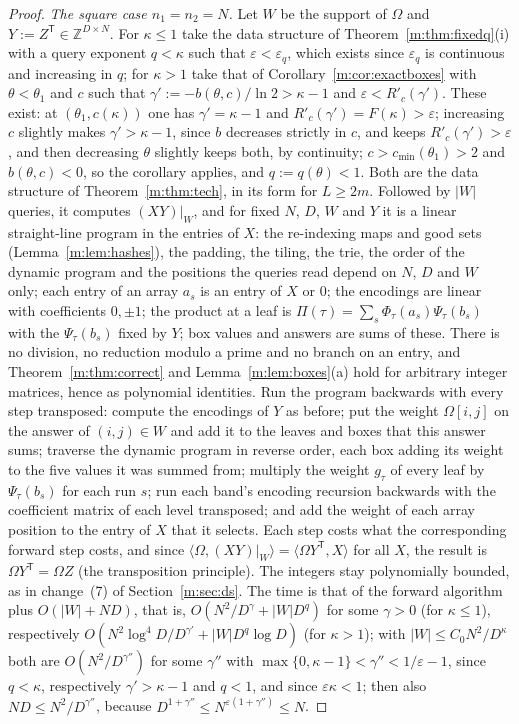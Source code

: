 \documentclass[11pt]{article}
\theoremstyle{definition}
\theoremstyle{remark}
\newcommand{\Z}{\mathbb{Z}}
\begin{document}
\begin{proof}
\emph{The square case $n_1=n_2=N$.} Let $W$ be the support of $\Omega$ and $Y:=Z^{\mathsf T}\in\Z^{D\times N}$. For $\kappa\le1$ take the data structure of Theorem~\ref{m:thm:fixedq}(i) with a query exponent $q<\kappa$ such that $\varepsilon<\varepsilon_q$, which exists since $\varepsilon_q$ is continuous and increasing in $q$; for $\kappa>1$ take that of Corollary~\ref{m:cor:exactboxes} with $\theta<\theta_1$ and $c$ such that $\gamma':=-b(\theta,c)/\ln2>\kappa-1$ and $\varepsilon<R'_c(\gamma')$. These exist: at $(\theta_1,c(\kappa))$ one has $\gamma'=\kappa-1$ and $R'_c(\gamma')=F(\kappa)>\varepsilon$; increasing $c$ slightly makes $\gamma'>\kappa-1$, since $b$ decreases strictly in $c$, and keeps $R'_c(\gamma')>\varepsilon$, and then decreasing $\theta$ slightly keeps both, by continuity; $c>c_{\min}(\theta_1)>2$ and $b(\theta,c)<0$, so the corollary applies, and $q:=q(\theta)<1$. Both are the data structure of Theorem~\ref{m:thm:tech}, in its form for $L\ge2m$. Followed by $|W|$ queries, it computes $(XY)|_W$, and for fixed $N$, $D$, $W$ and $Y$ it is a linear straight-line program in the entries of $X$: the re-indexing maps and good sets (Lemma~\ref{m:lem:hashes}), the padding, the tiling, the trie, the order of the dynamic program and the positions the queries read depend on $N$, $D$ and $W$ only; each entry of an array $a_s$ is an entry of $X$ or $0$; the encodings are linear with coefficients $0,\pm1$; the product at a leaf is $\Pi(\tau)=\sum_s\Phi_\tau(a_s)\Psi_\tau(b_s)$ with the $\Psi_\tau(b_s)$ fixed by $Y$; box values and answers are sums of these. There is no division, no reduction modulo a prime and no branch on an entry, and Theorem~\ref{m:thm:correct} and Lemma~\ref{m:lem:boxes}(a) hold for arbitrary integer matrices, hence as polynomial identities. Run the program backwards with every step transposed: compute the encodings of $Y$ as before; put the weight $\Omega[i,j]$ on the answer of $(i,j)\in W$ and add it to the leaves and boxes that this answer sums; traverse the dynamic program in reverse order, each box adding its weight to the five values it was summed from; multiply the weight $g_\tau$ of every leaf by $\Psi_\tau(b_s)$ for each run $s$; run each band's encoding recursion backwards with the coefficient matrix of each level transposed; and add the weight of each array position to the entry of $X$ that it selects. Each step costs what the corresponding forward step costs, and since $\langle\Omega,(XY)|_W\rangle=\langle\Omega Y^{\mathsf T},X\rangle$ for all $X$, the result is $\Omega Y^{\mathsf T}=\Omega Z$ (the transposition principle). The integers stay polynomially bounded, as in change~(7) of Section~\ref{m:sec:ds}. The time is that of the forward algorithm plus $O(|W|+ND)$, that is, $O(N^2/D^{\gamma}+|W|D^{q})$ for some $\gamma>0$ (for $\kappa\le1$), respectively $O(N^2\log^4\!D/D^{\gamma'}+|W|D^{q}\log D)$ (for $\kappa>1$); with $|W|\le C_0N^2/D^\kappa$ both are $O(N^2/D^{\gamma''})$ for some $\gamma''$ with $\max\{0,\kappa-1\}<\gamma''<1/\varepsilon-1$, since $q<\kappa$, respectively $\gamma'>\kappa-1$ and $q<1$, and since $\varepsilon\kappa<1$; then also $ND\le N^2/D^{\gamma''}$, because $D^{1+\gamma''}\le N^{\varepsilon(1+\gamma'')}\le N$.

\end{proof}
\end{document}
